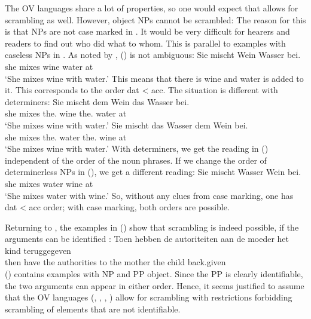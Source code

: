 The OV languages share a lot of properties, so one would expect that  allows for scrambling as
well. However, object NPs cannot be scrambled:
\z
The reason for this is that NPs are not case marked in . It would be very difficult for hearers
and readers to find out who did what to whom. This is parallel to examples with caseless NPs in
. As noted by \citet[]{Wegener85b}, () is not ambiguous:
\ea
\label{ex-sie-mischt-dem-wein-wasser-bei}
\gll Sie mischt Wein Wasser bei.\\
     she mixes  wine water  at\\\german
\glt `She mixes wine with water.'
\z
This means that there is wine and water is added to it. This corresponds to the order dat < acc.
The situation is different with determiners:
\eal
\ex 
\gll Sie mischt dem Wein das Wasser bei.\\
     she mixes  the.\DAT{} wine the.\ACC{} water at\\\german
\glt `She mixes wine with water.'
\ex Sie mischt das        Wasser dem        Wein bei.\\
    she mixes  the.\ACC{} water  the.\DAT{} wine at\\
\glt `She mixes wine with water.'
\zl
With determiners, we get the reading in () independent of the order of the noun phrases. If
we change the order of determinerless NPs in (), we get a different reading:
\ea
\gll Sie mischt Wasser Wein bei.\\
     she mixes  water wine  at\\\german
\glt `She mixes water with wine.'
\z
So, without any clues from case marking, one has dat < acc order; with case marking, both orders are possible.

Returning to , the examples in () show that scrambling is indeed possible, if the arguments can be
identified \parencites[]{GHdRvdT1984a-ed}[, 152]{Haider2010a}:
\eal
\ex
{}
\ex 
\gll Toen hebben de  autoriteiten aan de moeder  het kind  teruggegeven\\
     then have   the authorities  to  the mother the child back.given\\
\zl
() contains examples with NP and PP object. Since the PP is clearly identifiable, the two
arguments can appear in either order. Hence, it seems justified to assume that the OV languages (,
, , ) allow for scrambling with restrictions forbidding scrambling of elements that
are not identifiable.%

